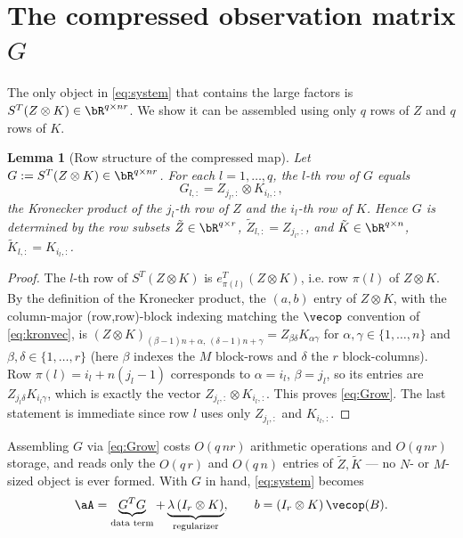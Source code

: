 \documentclass[12pt]{article}
\newtheorem{lemma}{Lemma}
\theoremstyle{definition}
\begin{document}
\section{The compressed observation matrix \texorpdfstring{$G$}{G}}

The only object in \eqref{eq:system} that contains the large factors is
$S^{T}(Z\otimes K)\in\bR^{q\times nr}$. We show it can be assembled using only
$q$ rows of $Z$ and $q$ rows of $K$.

\begin{lemma}[Row structure of the compressed map]\label{lem:G}
Let $G:=S^{T}(Z\otimes K)\in\bR^{q\times nr}$. For each $l=1,\dots,q$, the $l$-th
row of $G$ equals
\begin{equation}\label{eq:Grow}
G_{l,:}=Z_{j_l,:}\otimes K_{i_l,:},
\end{equation}
the Kronecker product of the $j_l$-th row of $Z$ and the $i_l$-th row of $K$.
Hence $G$ is determined by the row subsets $\tilde Z\in\bR^{q\times r}$,
$\tilde Z_{l,:}=Z_{j_l,:}$, and $\tilde K\in\bR^{q\times n}$,
$\tilde K_{l,:}=K_{i_l,:}$.
\end{lemma}

\begin{proof}
The $l$-th row of $S^{T}(Z\otimes K)$ is $e_{\pi(l)}^{T}(Z\otimes K)$, i.e. row
$\pi(l)$ of $Z\otimes K$. By the definition of the Kronecker product, the
$(a,b)$ entry of $Z\otimes K$, with the column-major (row,row)-block indexing
matching the $\vecop$ convention of \eqref{eq:kronvec}, is
$(Z\otimes K)_{(\beta-1)n+\alpha,\,(\delta-1)n+\gamma}=Z_{\beta\delta}K_{\alpha\gamma}$
for $\alpha,\gamma\in\{1,\dots,n\}$ and $\beta,\delta\in\{1,\dots,r\}$
(here $\beta$ indexes the $M$ block-rows and $\delta$ the $r$ block-columns).
Row $\pi(l)=i_l+n(j_l-1)$ corresponds to $\alpha=i_l$, $\beta=j_l$, so its entries
are $Z_{j_l\delta}K_{i_l\gamma}$, which is exactly the vector
$Z_{j_l,:}\otimes K_{i_l,:}$. This proves \eqref{eq:Grow}. The last statement is
immediate since row $l$ uses only $Z_{j_l,:}$ and $K_{i_l,:}$.
\end{proof}

Assembling $G$ via \eqref{eq:Grow} costs $O(q\,nr)$ arithmetic operations and
$O(q\,nr)$ storage, and reads only the $O(q\,r)$ and $O(q\,n)$ entries of
$\tilde Z,\tilde K$ — no $N$- or $M$-sized object is ever formed. With $G$ in
hand, \eqref{eq:system} becomes
\begin{equation}\label{eq:systemG}
\aA=\underbrace{G^{T}G}_{\text{data term}}+\underbrace{\lambda\,(I_r\otimes K)}_{\text{regularizer}},\qquad
b=(I_r\otimes K)\,\vecop(B).
\end{equation}
\end{document}
